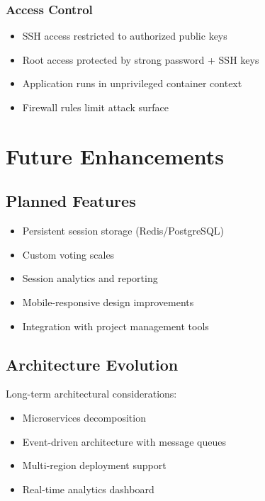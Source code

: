 \documentclass[11pt,a4paper]{article}
\begin{document}
\subsubsection{Access Control}

\begin{itemize}
    \item SSH access restricted to authorized public keys
    \item Root access protected by strong password + SSH keys
    \item Application runs in unprivileged container context
    \item Firewall rules limit attack surface
\end{itemize}

\section{Future Enhancements}

\subsection{Planned Features}

\begin{itemize}
    \item Persistent session storage (Redis/PostgreSQL)
    \item Custom voting scales
    \item Session analytics and reporting
    \item Mobile-responsive design improvements
    \item Integration with project management tools
\end{itemize}

\subsection{Architecture Evolution}

Long-term architectural considerations:

\begin{itemize}
    \item Microservices decomposition
    \item Event-driven architecture with message queues
    \item Multi-region deployment support
    \item Real-time analytics dashboard
\end{itemize}
\end{document}
